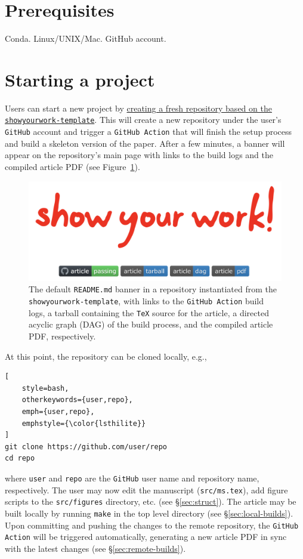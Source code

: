 \documentclass[twocolumn]{aastex631}
\begin{document}
\section{Prerequisites}
\label{sec:prereq}
Conda. Linux/UNIX/Mac. GitHub account.

\section{Starting a project}
\label{sec:start}
%
Users can start a new project by \href{https://github.com/rodluger/showyourwork-template/generate}{creating a fresh repository based on the \texttt{showyourwork-template}}.
This will create a new repository under the user's \texttt{GitHub} account and trigger a \texttt{GitHub Action} that will finish the setup process and build a skeleton version of the paper.
After a few minutes, a banner will appear on the repository's main page with links to the build logs and the compiled article PDF (see Figure~\ref{fig:banner}).
%
\begin{figure}[th!]
    \begin{centering}
        \includegraphics[width=\linewidth]{static/banner.png}
        \caption{
            The default \texttt{README.md} banner in a repository instantiated from the \texttt{showyourwork-template}, with links to the \texttt{GitHub Action} build logs, a tarball containing the \texttt{TeX} source for the article, a directed acyclic graph (DAG) of the build process, and the compiled article PDF, respectively.
        }
        \label{fig:banner}
    \end{centering}
\end{figure}
%
At this point, the repository can be cloned locally, e.g.,
%
\begin{lstlisting}[
    style=bash,
    otherkeywords={user,repo},
    emph={user,repo},
    emphstyle={\color{lsthilite}}
]
git clone https://github.com/user/repo
cd repo
\end{lstlisting}
%
where {\color{lsthilite}\texttt{user}} and {\color{lsthilite}\texttt{repo}} are the \texttt{GitHub} user name and repository name, respectively.
The user may now edit the manuscript (\texttt{src/ms.tex}), add figure scripts to the \texttt{src/figures} directory, etc. (see \S\ref{sec:struct}).
The article may be built locally by running \texttt{make} in the top level directory (see \S\ref{sec:local-builds}).
Upon committing and pushing the changes to the remote repository, the \texttt{GitHub Action} will be triggered automatically, generating a new article PDF in sync with the latest changes (see \S\ref{sec:remote-builds}).
\end{document}
